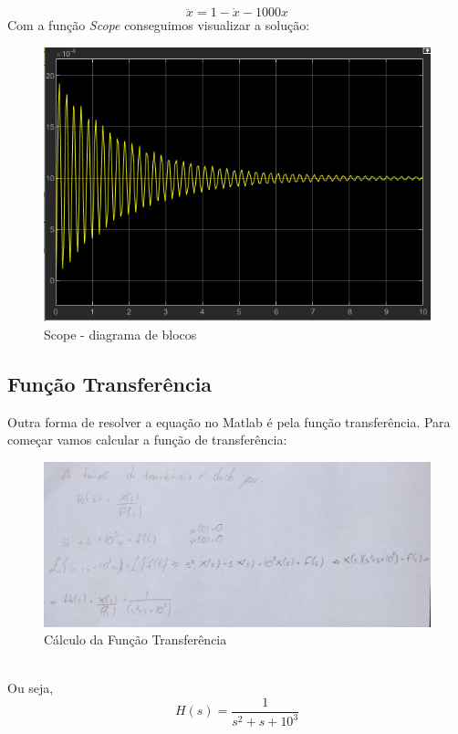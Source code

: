 \documentclass[a4paper, 12pt]{article}
\begin{document}
\begin{equation}
	\ddot{x} = 1 - \dot{x} - 1000 x
\end{equation}
Com a função \textit{Scope} conseguimos visualizar a solução:
\begin{figure}[h]
		\center
		\includegraphics[scale=0.6]{Imagens/scope.png}
		\caption{Scope - diagrama de blocos}
	\end{figure}

\newpage
\subsection{Função Transferência}
	Outra forma de resolver a equação no Matlab é pela função transferência. Para começar vamos calcular a função de transferência:
	\begin{figure}[h]
		\center
		\includegraphics[scale=0.6]{Imagens/ft.png}
		\caption{Cálculo da Função Transferência}
	\end{figure}
	\\
	Ou seja,
	\begin{equation}
		H(s) = \frac{1}{s^2 + s + 10^3}
	\end{equation}
	
\end{document}
